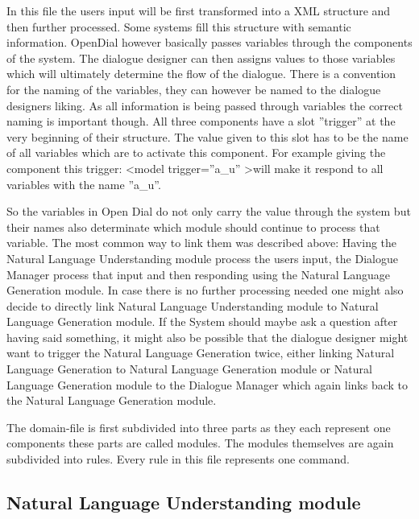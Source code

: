 In this file the users input will be first transformed into a XML structure and then further processed.
Some systems fill this structure with semantic information. 
OpenDial however basically passes variables through the components of the system. 
The dialogue designer can then assigns values to those variables which will ultimately determine the flow of the dialogue. 
There is a convention for the naming of the variables, they can however be named to the dialogue designers liking. 
As all information is being passed through variables the correct naming is important though. 
All three components have a slot ”trigger” at the very beginning of their structure. 
The value given to this slot has to be the name of all variables which are to activate this component.
For example giving the component this trigger: 
\textless model trigger=”a\_u” \textgreater will make it respond to all variables with the name ”a\_u”.  \newline

So the variables in Open Dial do not only carry the value through the system but their names also determinate which module should continue to process that variable. The most common way to link them was described above: Having the Natural Language Understanding module process the users input, the Dialogue Manager process that input and then responding using the Natural Language Generation module. 
In case there is no further processing needed one might also decide to directly link Natural Language Understanding module to Natural Language Generation module. 
If the System should maybe ask a question after having said something, it might also be possible that the dialogue designer might want to trigger the Natural Language Generation twice, either linking Natural Language Generation to Natural Language Generation module or Natural Language Generation module to the Dialogue Manager which again links back to the Natural Language Generation module. \newline

The domain-file is first subdivided into three parts as they each represent one components these parts are called modules. 
The modules themselves are again subdivided into rules. Every rule in this file represents one command. 

\subsection{Natural Language Understanding module}

